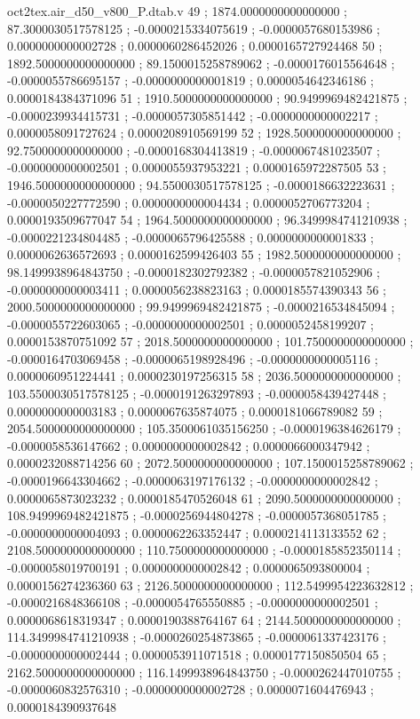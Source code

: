\begin{filecontents}[overwrite]{oct2tex.air_d50_v800_P.dtab.v}
49 ; 1874.0000000000000000 ; 87.3000030517578125 ; -0.0000215334075619 ; -0.0000057680153986 ; 0.0000000000002728 ; 0.0000060286452026 ; 0.0000165727924468
50 ; 1892.5000000000000000 ; 89.1500015258789062 ; -0.0000176015564648 ; -0.0000055786695157 ; -0.0000000000001819 ; 0.0000054642346186 ; 0.0000184384371096
51 ; 1910.5000000000000000 ; 90.9499969482421875 ; -0.0000239934415731 ; -0.0000057305851442 ; -0.0000000000002217 ; 0.0000058091727624 ; 0.0000208910569199
52 ; 1928.5000000000000000 ; 92.7500000000000000 ; -0.0000168304413819 ; -0.0000067481023507 ; -0.0000000000002501 ; 0.0000055937953221 ; 0.0000165972287505
53 ; 1946.5000000000000000 ; 94.5500030517578125 ; -0.0000186632223631 ; -0.0000050227772590 ; 0.0000000000004434 ; 0.0000052706773204 ; 0.0000193509677047
54 ; 1964.5000000000000000 ; 96.3499984741210938 ; -0.0000221234804485 ; -0.0000065796425588 ; 0.0000000000001833 ; 0.0000062636572693 ; 0.0000162599426403
55 ; 1982.5000000000000000 ; 98.1499938964843750 ; -0.0000182302792382 ; -0.0000057821052906 ; -0.0000000000003411 ; 0.0000056238823163 ; 0.0000185574390343
56 ; 2000.5000000000000000 ; 99.9499969482421875 ; -0.0000216534845094 ; -0.0000055722603065 ; -0.0000000000002501 ; 0.0000052458199207 ; 0.0000153870751092
57 ; 2018.5000000000000000 ; 101.7500000000000000 ; -0.0000164703069458 ; -0.0000065198928496 ; -0.0000000000005116 ; 0.0000060951224441 ; 0.0000230197256315
58 ; 2036.5000000000000000 ; 103.5500030517578125 ; -0.0000191263297893 ; -0.0000058439427448 ; 0.0000000000003183 ; 0.0000067635874075 ; 0.0000181066789082
59 ; 2054.5000000000000000 ; 105.3500061035156250 ; -0.0000196384626179 ; -0.0000058536147662 ; 0.0000000000002842 ; 0.0000066000347942 ; 0.0000232088714256
60 ; 2072.5000000000000000 ; 107.1500015258789062 ; -0.0000196643304662 ; -0.0000063197176132 ; -0.0000000000002842 ; 0.0000065873023232 ; 0.0000185470526048
61 ; 2090.5000000000000000 ; 108.9499969482421875 ; -0.0000256944804278 ; -0.0000057368051785 ; -0.0000000000004093 ; 0.0000062263352447 ; 0.0000214113133552
62 ; 2108.5000000000000000 ; 110.7500000000000000 ; -0.0000185852350114 ; -0.0000058019700191 ; 0.0000000000002842 ; 0.0000065093800004 ; 0.0000156274236360
63 ; 2126.5000000000000000 ; 112.5499954223632812 ; -0.0000216848366108 ; -0.0000054765550885 ; -0.0000000000002501 ; 0.0000068618319347 ; 0.0000190388764167
64 ; 2144.5000000000000000 ; 114.3499984741210938 ; -0.0000260254873865 ; -0.0000061337423176 ; -0.0000000000002444 ; 0.0000053911071518 ; 0.0000177150850504
65 ; 2162.5000000000000000 ; 116.1499938964843750 ; -0.0000262447010755 ; -0.0000060832576310 ; -0.0000000000002728 ; 0.0000071604476943 ; 0.0000184390937648

\end{filecontents}
